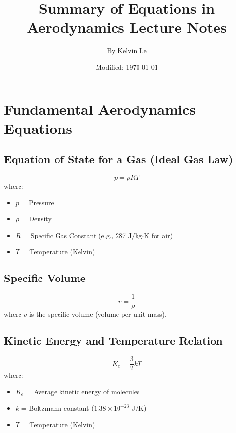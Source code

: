\documentclass{article}
\begin{document}
\title{Summary of Equations in Aerodynamics Lecture Notes}
\author{By Kelvin Le}
\date{Modified: \today}
\maketitle

\tableofcontents

\section{Fundamental Aerodynamics Equations}

\subsection{Equation of State for a Gas (Ideal Gas Law)}
\begin{equation}
    p = \rho R T
\end{equation}
where:
\begin{itemize}
    \item $p$ = Pressure
    \item $\rho$ = Density
    \item $R$ = Specific Gas Constant (e.g., 287 J/kg$\cdot$K for air)
    \item $T$ = Temperature (Kelvin)
\end{itemize}

\subsection{Specific Volume}
\begin{equation}
    v = \frac{1}{\rho}
\end{equation}
where $v$ is the specific volume (volume per unit mass).

\subsection{Kinetic Energy and Temperature Relation}
\begin{equation}
    K_e = \frac{3}{2} k T
\end{equation}
where:
\begin{itemize}
    \item $K_e$ = Average kinetic energy of molecules
    \item $k$ = Boltzmann constant ($1.38 \times 10^{-23}$ J/K)
    \item $T$ = Temperature (Kelvin)
\end{itemize}
\end{document}
